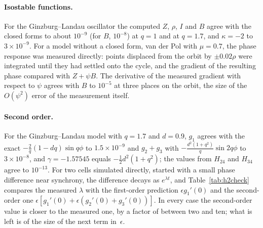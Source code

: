 \documentclass[11pt,a4paper]{article}
\begin{document}
\paragraph{Isostable functions.} For the Ginzburg--Landau oscillator the computed $Z$, $\rho$, $I$ and $B$ agree with the closed forms to about $10^{-9}$ (for $B$, $10^{-8}$) at $q=1$ and at $q=1.7$, and $\kappa=-2$ to $3\times10^{-9}$. For a model without a closed form, van der Pol with $\mu=0.7$, the phase response was measured directly: points displaced from the orbit by $\pm0.02\rho$ were integrated until they had settled onto the cycle, and the gradient of the resulting phase compared with $Z+\psi B$. The derivative of the measured gradient with respect to $\psi$ agrees with $B$ to $10^{-5}$ at three places on the orbit, the size of the $O(\psi^2)$ error of the measurement itself.

\paragraph{Second order.} For the Ginzburg--Landau model with $q=1.7$ and $d=0.9$, $g_1$ agrees with the exact $-\frac2q(1-dq)\sin q\phi$ to $1.5\times10^{-9}$ and $g_2+g_3$ with $-\frac{d^2(1+q^2)}{q}\sin2q\phi$ to $3\times10^{-8}$, and $\gamma=-1.57545$ equals $-\frac12d^2(1+q^2)$; the values from $H_{24}$ and $H_{34}$ agree to $10^{-13}$. For two cells simulated directly, started with a small phase difference near synchrony, the difference decays as $e^{\lambda t}$, and Table~\ref{tab:h2check} compares the measured $\lambda$ with the first-order prediction $\epsilon g_1'(0)$ and the second-order one $\epsilon[g_1'(0)+\epsilon(g_2'(0)+g_3'(0))]$. In every case the second-order value is closer to the measured one, by a factor of between two and ten; what is left is of the size of the next term in~$\epsilon$.
\end{document}
